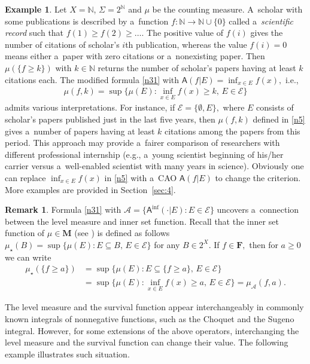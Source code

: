 \documentclass[preprint,11pt]{elsarticle}
\theoremstyle{definition}
\newtheorem{example}[tw]{Example}
\newtheorem{remark}[tw]{Remark}
\newcommand\mN{{\mathbb N}}
\newcommand\bF{\mathbf{F}} %
\newcommand\bM{\mathbf{M}} %
\newcommand\cE{{\mathcal E}}
\newcommand\sA{\mathsf{A}}
\newcommand\aA[2][E]{\sA(#2|#1)}%
\newcommand\bA{\mathscr{A}}%
\newcommand\mub[1][\bA]{\mu_{#1}}
\renewcommand\ge{\geqslant}
\newcommand\st{\star}
\newcommand{\tx}{\textstyle{}}
\begin{document}
\begin{example}\label{ex:2.5}
Let $X=\mN$, $\Sigma=2^{\mathbb{N}}$ and $\mu$ be the counting measure.
A~scholar with some publications is described by a~function $f\colon \mathbb{N}\to\mathbb{N}\cup\{0\}$ called a~\textit{scientific record} such that $f(1)\ge f(2)\ge\ldots.$
The positive value of $f(i)$ gives the number of citations of scholar's $i$th publication, whereas the value $f(i)=0$ means either a~paper with zero citations or a~nonexisting paper.
Then $\mu(\{f\ge k\})$ with $k\in\mN$ returns the number of scholar's papers having at least $k$ citations each. The modified formula \eqref{n31} with $\aA{f}={\tx \inf_{x\in E} f(x)},$ i.e.,
\begin{align}\label{n5}
    \mu(f,k)=\sup\big\{\mu(E)\colon \inf_{x\in E} f(x)\ge k,\, E\in \cE\big\}
\end{align}
admits various interpretations. For instance, if $\cE=\{\emptyset,E\},$ where $E$ consists of scholar's papers published just in the last five years, then $\mu(f,k)$ defined in \eqref{n5} gives a~number of papers having at least $k$ citations among the papers from this period. This approach may provide a~fairer comparison of researchers with different professional internship (e.g., a~young scientist beginning of his/her carrier versus a~well-enabled scientist with many years in science).
Obviously one can replace $\textstyle{\inf_{x\in E} f(x)}$ in \eqref{n5} with a~CAO $\aA{f}$ to change the criterion. More examples are provided in Section~\ref{sec:4}.
\end{example}

\begin{remark}
Formula %
\eqref{n31} with $\bA=\{\sA^{\inf}(\cdot|E)\colon E\in \cE\}$ uncovers a~connection between the level measure and inner set function. Recall that the inner set function of $\mu\in \bM$ (see \cite[p.~21]{denneberg00}) is defined as follows
$\mu_\st(B)=\sup\{\mu(E)\colon E\subseteq B,\, E\in \cE\}$
for any $B\in 2^X.$ If $f\in\bF,$ then for $a\ge 0$ we can write
\begin{align*}
    \mu_\st (\{f\ge a\})&=\sup\{\mu(E)\colon E\subseteq \{f\ge a\},\,E\in \cE\}\\
    &=\sup\big\{\mu(E)\colon \inf_{x\in E} f(x)\ge a,\, E\in \cE\big\}=\mub (f,a).
\end{align*}
\end{remark}

The level measure and the survival function appear interchangeably in commonly known integrals of nonnegative functions, such as the Choquet  and the Sugeno integral. However, for some extensions of the above operators, interchanging the level measure and the survival function can change their value.
The following example illustrates such situation.
\end{document}
